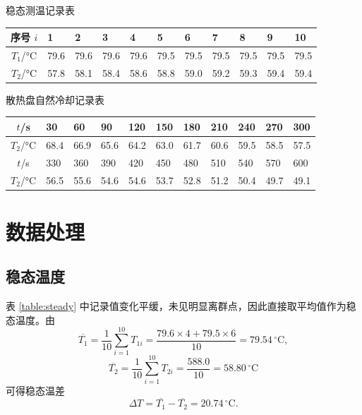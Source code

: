 \documentclass{../template/myrpt}
\begin{document}
\begin{LabRecordTable}
  \centering
  \caption{稳态测温记录表}
  \label{table:steady}
  \renewcommand{\arraystretch}{1.25}
  \setlength{\tabcolsep}{3.5pt}
  \begin{tabularx}{\textwidth}{c *{10}{Y}}
    \toprule
    序号 $i$ & 1 & 2 & 3 & 4 & 5 & 6 & 7 & 8 & 9 & 10 \\
    \midrule
    $T_1$/\si{\celsius} & 79.6 & 79.6 & 79.6 & 79.6 & 79.5 & 79.5 & 79.5 & 79.5 & 79.5 & 79.5 \\
    $T_2$/\si{\celsius} & 57.8 & 58.1 & 58.4 & 58.6 & 58.8 & 59.0 & 59.2 & 59.3 & 59.4 & 59.4 \\
    \bottomrule
  \end{tabularx}
\end{LabRecordTable}

\begin{LabRecordTable}
  \centering
  \caption{散热盘自然冷却记录表}
  \label{table:cooling}
  \renewcommand{\arraystretch}{1.25}
  \setlength{\tabcolsep}{3.5pt}
  \begin{tabularx}{\textwidth}{c *{10}{Y}}
    \toprule
    $t$/s & 30 & 60 & 90 & 120 & 150 & 180 & 210 & 240 & 270 & 300 \\
    \midrule
    $T_2$/\si{\celsius} & 68.4 & 66.9 & 65.6 & 64.2 & 63.0 & 61.7 & 60.6 & 59.5 & 58.5 & 57.5 \\
    \midrule
    $t$/s & 330 & 360 & 390 & 420 & 450 & 480 & 510 & 540 & 570 & 600 \\
    \midrule
    $T_2$/\si{\celsius} & 56.5 & 55.6 & 54.6 & 54.6 & 53.7 & 52.8 & 51.2 & 50.4 & 49.7 & 49.1 \\
    \bottomrule
  \end{tabularx}
\end{LabRecordTable}

\section{数据处理}
\subsection{稳态温度}
表 \ref{table:steady} 中记录值变化平缓，未见明显离群点，因此直接取平均值作为稳态温度。由
\[
  \overline{T_1}
  =
  \frac{1}{10}\sum_{i=1}^{10} T_{1i}
  =
  \frac{79.6\times 4 + 79.5\times 6}{10}
  =
  79.54\,^{\circ}\mathrm{C},
\]
\[
  \overline{T_2}
  =
  \frac{1}{10}\sum_{i=1}^{10} T_{2i}
  =
  \frac{588.0}{10}
  =
  58.80\,^{\circ}\mathrm{C}
\]
可得稳态温差
\[
  \Delta T = \overline{T_1} - \overline{T_2} = 20.74\,^{\circ}\mathrm{C}.
\]
\end{document}

